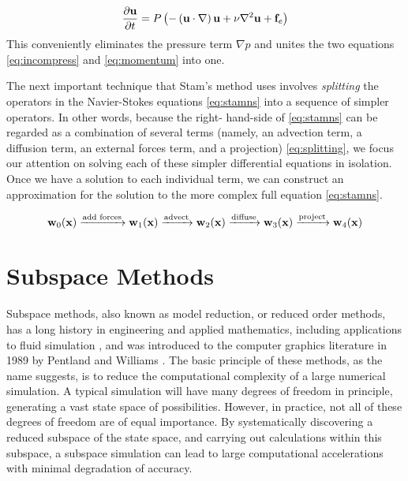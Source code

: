 \begin{equation}
\label{eq:stamns}
\frac{\partial \mathbf{u}}{\partial t} = P\left(-\left(\mathbf{u} \cdot \nabla \right)\mathbf{u} + \nu \nabla^{2}\mathbf{u} + \mathbf{f}_e\right)
\end{equation}
This conveniently eliminates the pressure term $\nabla p$ and unites the two equations \ref{eq:incompress} and \ref{eq:momentum} into one.

The next important technique that Stam's method uses involves {\em splitting} the operators in the Navier-Stokes equations \ref{eq:stamns} into a sequence of simpler operators. In other words, because the right-
hand-side of \ref{eq:stamns} can be regarded as a combination of several terms (namely, an advection term, a diffusion term, an external forces term, and a projection) \ref{eq:splitting}, we focus our attention on solving each of these simpler differential equations in isolation. Once we have a solution to each individual term, we can construct an approximation for the solution to the more complex full equation \ref{eq:stamns}. 

\begin{equation}
\label{eq:splitting}
\mathbf{w}_0(\mathbf{x}) \xrightarrow{\text{add forces}} \mathbf{w}_1(\mathbf{x}) \xrightarrow{\text{advect}} \mathbf{w}_2(\mathbf{x}) \xrightarrow{\text{diffuse}} \mathbf{w}_3(\mathbf{x}) \xrightarrow{\text{project}} \mathbf{w}_4(\mathbf{x})
\end{equation}
 
\section{Subspace Methods}
Subspace methods, also known as model reduction, or reduced order methods, has a long history in engineering and applied mathematics, including applications to fluid simulation \cite{lumley1967}, and was introduced to the computer graphics literature in 1989 by Pentland and Williams \cite{Pentland:1989:GVM, Berkooz93theproper}. The basic principle of these methods, as the name suggests, is to reduce the computational complexity of a large numerical simulation. A typical simulation will have many degrees of freedom in principle, generating a vast state space of possibilities. However, in practice, not all of these degrees of freedom are of equal importance. By systematically discovering a reduced subspace of the state space, and carrying out calculations within this subspace, a subspace simulation can lead to large computational accelerations with minimal degradation of accuracy.

